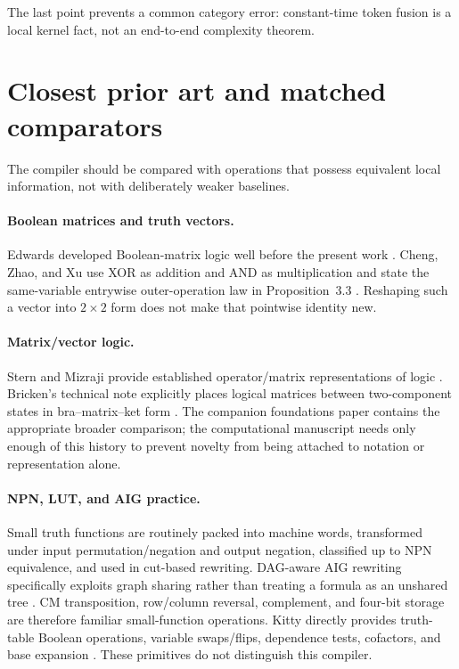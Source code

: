 \documentclass[10pt]{article}
\theoremstyle{plain}
\theoremstyle{definition}
\theoremstyle{remark}
\begin{document}
The last point prevents a common category error: constant-time token fusion is a local kernel fact, not an end-to-end complexity theorem.

\section{Closest prior art and matched comparators}
\label{sec:related}

The compiler should be compared with operations that possess equivalent local information, not with deliberately weaker baselines.

\paragraph{Boolean matrices and truth vectors.}
Edwards developed Boolean-matrix logic well before the present work \cite{Edwards1972}. Cheng, Zhao, and Xu use XOR as addition and AND as multiplication and state the same-variable entrywise outer-operation law in Proposition~3.3 \cite{Cheng2011}. Reshaping such a vector into $2\times2$ form does not make that pointwise identity new.

\paragraph{Matrix/vector logic.}
Stern and Mizraji provide established operator/matrix representations of logic \cite{Stern1988,Mizraji1992,Mizraji2008}. Bricken's technical note explicitly places logical matrices between two-component states in bra--matrix--ket form \cite{Bricken1997}. The companion foundations paper contains the appropriate broader comparison; the computational manuscript needs only enough of this history to prevent novelty from being attached to notation or representation alone.

\paragraph{NPN, LUT, and AIG practice.}
Small truth functions are routinely packed into machine words, transformed under input permutation/negation and output negation, classified up to NPN equivalence, and used in cut-based rewriting. DAG-aware AIG rewriting specifically exploits graph sharing rather than treating a formula as an unshared tree \cite{Mishchenko2006,Zhou2019,Testa2019}. CM transposition, row/column reversal, complement, and four-bit storage are therefore familiar small-function operations. Kitty directly provides truth-table Boolean operations, variable swaps/flips, dependence tests, cofactors, and base expansion \cite{KittyOperations}. These primitives do not distinguish this compiler.
\end{document}
